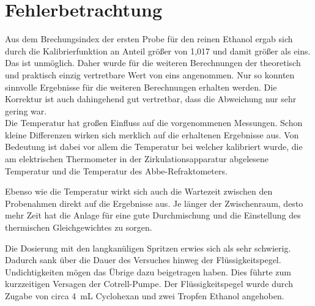 \newpage
\section{Fehlerbetrachtung}
\label{sec:fehler}

Aus dem Brechungsindex der ersten Probe für den reinen Ethanol ergab sich durch die Kalibrierfunktion an Anteil größer von 1,017 und damit größer als eins. Das ist unmöglich. Daher wurde für die weiteren Berechnungen der theoretisch und praktisch einzig vertretbare Wert von eins angenommen. Nur so konnten sinnvolle Ergebnisse für die weiteren Berechnungen erhalten werden. Die Korrektur ist auch dahingehend gut vertretbar, dass die Abweichung nur sehr gering war.\\


Die Temperatur hat großen Einfluss auf die vorgenommenen Messungen. Schon kleine Differenzen wirken sich merklich auf die erhaltenen Ergebnisse aus. Von Bedeutung ist dabei vor allem die Temperatur bei welcher kalibriert wurde, die am elektrischen Thermometer in der Zirkulationsapparatur abgelesene Temperatur und die Temperatur des Abbe-Refraktometers.

Ebenso wie die Temperatur wirkt sich auch die Wartezeit zwischen den Probenahmen direkt auf die Ergebnisse aus. Je länger der Zwischenraum, desto mehr Zeit hat die Anlage für eine gute Durchmischung und die Einstellung des thermischen Gleichgewichtes zu sorgen.

Die Dosierung mit den langkanüligen Spritzen erwies sich als sehr schwierig. Dadurch sank über die Dauer des Versuches hinweg der Flüssigkeitspegel. Undichtigkeiten mögen das Übrige dazu beigetragen haben. Dies führte zum kurzzeitigen Versagen der Cotrell-Pumpe. Der Flüssigkeitspegel wurde durch Zugabe von circa \SI{4}{\milli\liter} Cyclohexan und zwei Tropfen Ethanol angehoben. 



